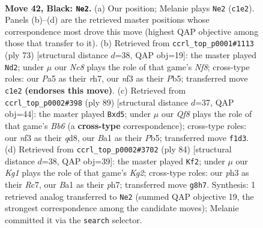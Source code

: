 \documentclass[11pt]{article}
\begin{document}
\clearpage

\begin{figure}[p]\centering
\begin{subfigure}{0.46\textwidth}\centering
\resizebox{\linewidth}{!}{%
\newchessgame
\chessboard[
  setfen={6k1/1p3p2/6p1/p7/7p/5N1P/P5PK/b1n2q2 b - - 3 42},
  showmover=false,
  pgfstyle=straightmove, color=movearrow, markmove={c1-e2}
]}
\caption{}
\end{subfigure}\hfill
\begin{subfigure}{0.46\textwidth}\centering
\resizebox{\linewidth}{!}{%
\newchessgame
\chessboard[
  setfen={8/p6R/4pkp1/1p6/3K4/PP1N2P1/r4P2/5n2 b - - 2 37},
  showmover=false,
  pgfstyle=straightmove, color=movearrow, markmove={f1-d2}
]}
\caption{}
\end{subfigure}
\\[4pt]
\begin{subfigure}{0.46\textwidth}\centering
\resizebox{\linewidth}{!}{%
\newchessgame
\chessboard[
  setfen={3Q4/5kp1/5p2/1p1Np3/8/Pb3P1P/6PK/2q5 b - - 10 45},
  showmover=false,
  pgfstyle=straightmove, color=movearrow, markmove={b3-d5}
]}
\caption{}
\end{subfigure}\hfill
\begin{subfigure}{0.46\textwidth}\centering
\resizebox{\linewidth}{!}{%
\newchessgame
\chessboard[
  setfen={4r3/2R4p/1p4k1/pP3p2/3n1P2/4N3/1P2P1KP/8 w - - 2 43},
  showmover=false,
  pgfstyle=straightmove, color=movearrow, markmove={g2-f2}
]}
\caption{}
\end{subfigure}
\caption{\textbf{Move 42, Black: \texttt{Ne2}.} (a) Our position; Melanie plays \texttt{Ne2} (\texttt{c1e2}). Panels (b)--(d) are the retrieved master positions whose correspondence most drove this move (highest QAP objective among those that transfer to it). (b) Retrieved from \texttt{ccrl\_top\_p0001\#1113} (ply 73) [structural distance $d$=38, QAP obj=19]: the master played \texttt{Nd2}; under $\mu$ our \emph{Nc8} plays the role of that game's \emph{Nf8}; cross-type roles: our \emph{P}a5 as their \emph{r}h7, our \emph{n}f3 as their \emph{P}b5; transferred move \texttt{c1e2} \textbf{(endorses this move)}. (c) Retrieved from \texttt{ccrl\_top\_p0002\#398} (ply 89) [structural distance $d$=37, QAP obj=44]: the master played \texttt{Bxd5}; under $\mu$ our \emph{Qf8} plays the role of that game's \emph{Bb6} (a \textbf{cross-type} correspondence); cross-type roles: our \emph{n}f3 as their \emph{q}d8, our \emph{B}a1 as their \emph{P}b5; transferred move \texttt{f1d3}. (d) Retrieved from \texttt{ccrl\_top\_p0002\#3702} (ply 84) [structural distance $d$=38, QAP obj=39]: the master played \texttt{Kf2}; under $\mu$ our \emph{Kg1} plays the role of that game's \emph{Kg2}; cross-type roles: our \emph{p}h3 as their \emph{R}c7, our \emph{B}a1 as their \emph{p}h7; transferred move \texttt{g8h7}. Synthesis: 1 retrieved analog transferred to \texttt{Ne2} (summed QAP objective 19, the strongest correspondence among the candidate moves); Melanie committed it via the \texttt{search} selector.}
\label{fig:thought-m83}
\end{figure}
\end{document}
